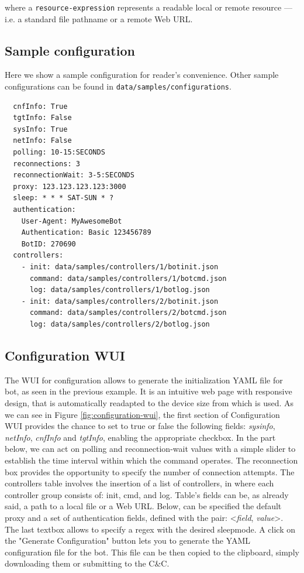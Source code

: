 where a \texttt{resource-expression} represents a readable local or remote resource — i.e. a standard file pathname or a remote Web URL.

\subsection{Sample configuration}
\label{sec:sample-configuration}

Here we show a sample configuration for reader's convenience. Other sample configurations can be found in \texttt{data/samples/configurations}.

\begin{verbatim}
  cnfInfo: True
  tgtInfo: False
  sysInfo: True
  netInfo: False
  polling: 10-15:SECONDS
  reconnections: 3
  reconnectionWait: 3-5:SECONDS
  proxy: 123.123.123.123:3000
  sleep: * * * SAT-SUN * ?
  authentication:
    User-Agent: MyAwesomeBot
    Authentication: Basic 123456789
    BotID: 270690
  controllers:
    - init: data/samples/controllers/1/botinit.json
      command: data/samples/controllers/1/botcmd.json
      log: data/samples/controllers/1/botlog.json
    - init: data/samples/controllers/2/botinit.json
      command: data/samples/controllers/2/botcmd.json
      log: data/samples/controllers/2/botlog.json
\end{verbatim}

\subsection{Configuration WUI}\label{sec:configuration-wui}
The WUI for configuration allows to generate the initialization YAML file for bot, as seen in the previous example. It is an intuitive web page with responsive design, that is automatically readapted to the device size from which is used. As we can see in Figure \ref{fig:configuration-wui}, the first section of Configuration WUI provides the chance to set to true or false the following fields: \textit{sysinfo}, \textit{netInfo}, \textit{cnfInfo} and \textit{tgtInfo}, enabling the appropriate checkbox. In the part below, we can act on polling and reconnection-wait values with a simple slider to establish the time interval within which the command operates. The reconnection box provides the opportunity to specify the number of connection attempts. The controllers table involves the insertion of a list of controllers, in where each controller group consists of: init, cmd, and log. Table’s fields can be, as already said, a path to a local file or a Web URL. Below, can be specified the default proxy and a set of authentication fields, defined with the pair: <\textit{field}, \textit{value}>. The last textbox allows to specify a regex with the desired sleepmode. A click on the "Generate Configuration" button lets you to generate the YAML configuration file for the bot. This file can be then copied to the clipboard, simply downloading them or submitting to the C\&C.


